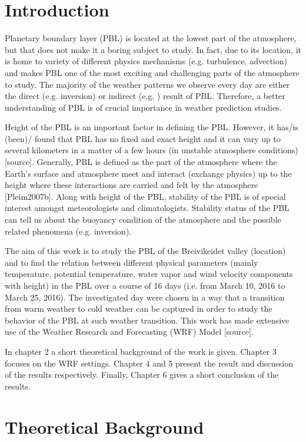 \documentclass[a4paper,12pt]{article}
\numberwithin{equation}{section} %
\begin{document}
\section{Introduction}

Planetary boundary layer (PBL) is located at the lowest part of the atmosphere, but that does not make it a boring subject to study. In fact, due to its location, it is home to variety of different physics mechanisms (e.g. turbulence, advection) and makes PBL one of the most exciting and challenging parts of the atmosphere to study. The majority of the weather patterns we observe every day are either the direct (e.g. inversion) or indirect (e.g. ) result of PBL. Therefore, a better understanding of PBL is of crucial importance in weather prediction studies. 

Height of the PBL is an important factor in defining the PBL. However, it has/is (been)/ found that PBL has no fixed and exact height and it can vary up to several kilometers in a matter of a few hours (in unstable atmosphere conditions) [source]. Generally, PBL is defined as the part of the atmosphere where the Earth's surface and atmosphere meet and interact (exchange physics) up to the height where these interactions are carried and felt by the atmosphere [Pleim2007b]. Along with height of the PBL, stability of the PBL is of special interest amongst meteorologists and climatologists. Stability status of the PBL can tell us about the buoyancy condition of the atmosphere and the possible related phenomena (e.g. inversion).

The aim of this work is to study the PBL of the Breivikeidet valley (location) and to find the relation between different physical parameters (mainly temperature, potential temperature, water vapor and wind velocity components with height) in the PBL over a course of 16 days (i.e. from March 10, 2016 to March 25, 2016). The investigated day were chosen in a way that a transition from warm weather to cold weather can be captured in order to study the behavior of the PBL at such weather transition. This work has made extensive use of the Weather Research and Forecasting (WRF) Model [source].

In chapter 2 a short theoretical background of the work is given. Chapter 3 focuses on the WRF settings. Chapter 4 and 5 present the result and discussion of the results respectively. Finally, Chapter 6 gives a short conclusion of the results.

\newpage

\section{Theoretical Background}
\end{document}
